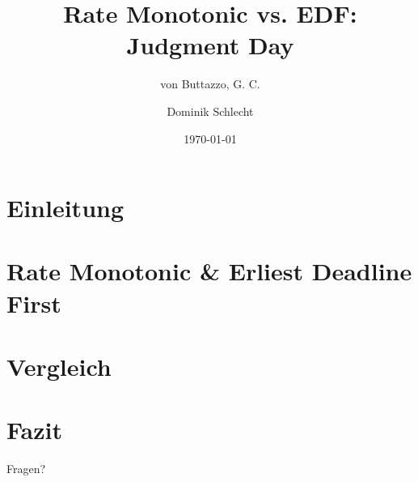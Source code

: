 \documentclass[unknownkeysallowed]{beamer}
\title{Rate Monotonic vs. EDF: Judgment Day}
\subtitle{von Buttazzo, G. C.}
\date{\today}
\author{Dominik Schlecht}
\institute[THI]{Technische Hochschule Ingolstadt}
\begin{document}
	\frame{\maketitle}
	\frame{\tableofcontents[hideallsubsections]}
	
	
	\section{Einleitung}
	
	
	\section{Rate Monotonic \& Erliest Deadline First}
	

	
	\section{Vergleich}
	
	
	\section{Fazit}
	
	
	\begin{frame}{\subsecname}
		Fragen?
	\end{frame}
	
\end{document}
